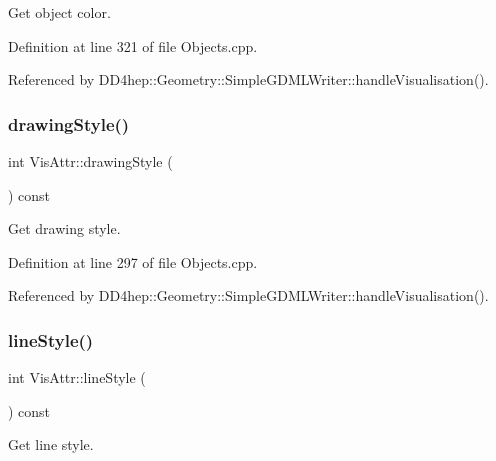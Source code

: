 Get object color. 



Definition at line 321 of file Objects.\+cpp.



Referenced by D\+D4hep\+::\+Geometry\+::\+Simple\+G\+D\+M\+L\+Writer\+::handle\+Visualisation().

\hypertarget{class_d_d4hep_1_1_geometry_1_1_vis_attr_aec03c67138c881de29de1f03714d2fcf}{}\label{class_d_d4hep_1_1_geometry_1_1_vis_attr_aec03c67138c881de29de1f03714d2fcf} 
\subsubsection{\texorpdfstring{drawing\+Style()}{drawingStyle()}}
{\footnotesize\ttfamily int Vis\+Attr\+::drawing\+Style (\begin{DoxyParamCaption}{ }\end{DoxyParamCaption}) const}



Get drawing style. 



Definition at line 297 of file Objects.\+cpp.



Referenced by D\+D4hep\+::\+Geometry\+::\+Simple\+G\+D\+M\+L\+Writer\+::handle\+Visualisation().

\hypertarget{class_d_d4hep_1_1_geometry_1_1_vis_attr_a7dd0a16cc0fe20a9c947e8455b9144e2}{}\label{class_d_d4hep_1_1_geometry_1_1_vis_attr_a7dd0a16cc0fe20a9c947e8455b9144e2} 
\subsubsection{\texorpdfstring{line\+Style()}{lineStyle()}}
{\footnotesize\ttfamily int Vis\+Attr\+::line\+Style (\begin{DoxyParamCaption}{ }\end{DoxyParamCaption}) const}



Get line style. 



